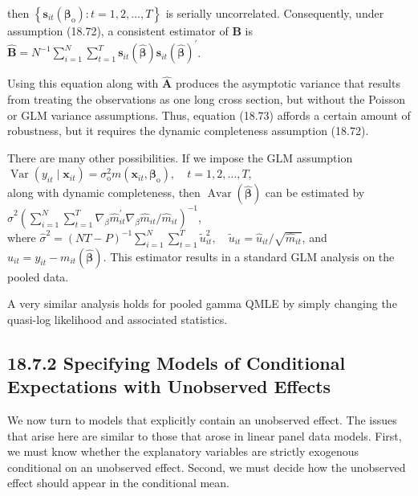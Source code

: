 \documentclass[10pt]{article}
\begin{document}
then $\left\{\mathbf{s}_{i t}\left(\boldsymbol{\beta}_{\mathrm{o}}\right): t=1,2, \ldots, T\right\}$ is serially uncorrelated. Consequently, under assumption (18.72), a consistent estimator of $\mathbf{B}$ is\\
$\hat{\mathbf{B}}=N^{-1} \sum_{i=1}^{N} \sum_{t=1}^{T} \mathbf{s}_{i t}(\hat{\boldsymbol{\beta}}) \mathbf{s}_{i t}(\hat{\boldsymbol{\beta}})^{\prime}$.

Using this equation along with $\hat{\mathbf{A}}$ produces the asymptotic variance that results from treating the observations as one long cross section, but without the Poisson or GLM variance assumptions. Thus, equation (18.73) affords a certain amount of robustness, but it requires the dynamic completeness assumption (18.72).

There are many other possibilities. If we impose the GLM assumption\\
$\operatorname{Var}\left(y_{i t} \mid \mathbf{x}_{i t}\right)=\sigma_{\mathrm{o}}^{2} m\left(\mathbf{x}_{i t}, \boldsymbol{\beta}_{\mathrm{o}}\right), \quad t=1,2, \ldots, T$,\\
along with dynamic completeness, then $\operatorname{Avar}(\hat{\boldsymbol{\beta}})$ can be estimated by\\
$\hat{\sigma}^{2}\left(\sum_{i=1}^{N} \sum_{t=1}^{T} \nabla_{\beta} \hat{m}_{i t}^{\prime} \nabla_{\beta} \hat{m}_{i t} / \hat{m}_{i t}\right)^{-1}$,\\
where $\hat{\sigma}^{2}=(N T-P)^{-1} \sum_{i=1}^{N} \sum_{t=1}^{T} \tilde{u}_{i t}^{2}, \quad \tilde{u}_{i t}=\hat{u}_{i t} / \sqrt{\hat{m}_{i t}}$, and $\hat{u}_{i t}=y_{i t}-m_{i t}(\hat{\boldsymbol{\beta}})$. This estimator results in a standard GLM analysis on the pooled data.

A very similar analysis holds for pooled gamma QMLE by simply changing the quasi-log likelihood and associated statistics.

\subsection*{18.7.2 Specifying Models of Conditional Expectations with Unobserved Effects}
We now turn to models that explicitly contain an unobserved effect. The issues that arise here are similar to those that arose in linear panel data models. First, we must know whether the explanatory variables are strictly exogenous conditional on an unobserved effect. Second, we must decide how the unobserved effect should appear in the conditional mean.
\end{document}
